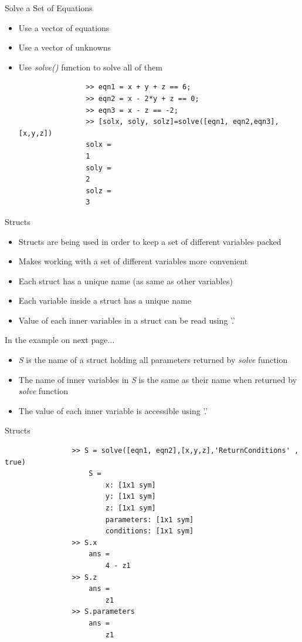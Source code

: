 \documentclass{beamer}
\begin{document}
\begin{frame}[fragile]{Solve a Set of Equations}
	\begin{block}{}
		\begin{itemize}
			\item Use a vector of equations
			\item Use a vector of unknowns
			\item Use \textit{solve()} function to solve all of them
			\java
			\begin{lstlisting}
				>> eqn1 = x + y + z == 6;
				>> eqn2 = x - 2*y + z == 0;
				>> eqn3 = x - z == -2;
				>> [solx, soly, solz]=solve([eqn1, eqn2,eqn3],[x,y,z])
				solx =
				1
				soly =
				2
				solz =
				3
			\end{lstlisting}
		\end{itemize}
	\end{block}
\end{frame}

\begin{frame}[fragile]{Structs}
	\begin{block}{}
		\begin{itemize}
			\item Structs are being used in order to keep a set of different variables packed
			\item Makes working with a set of different variables more convenient
			\item Each struct has a unique name (as same as other variables)
			\item Each variable inside a struct has a unique name
			\item Value of each inner variables in a struct can be read using '.'
		\end{itemize}
	\end{block}
	\begin{block}{In the example on next page...}
		\begin{itemize}
			\item \textit{S} is the name of a struct holding all parameters returned by \textit{solve} function
			\item The name of inner variables in \textit{S} is the same as their name when returned by \textit{solve} function
			\item The value of each inner variable is accessible using '.'
		\end{itemize}
	\end{block}
\end{frame}

\begin{frame}[fragile]{Structs}
	\begin{block}{}
			\java
				\begin{lstlisting}
				>> S = solve([eqn1, eqn2],[x,y,z],'ReturnConditions' , true)
					S = 
						x: [1x1 sym]
						y: [1x1 sym]
						z: [1x1 sym]
						parameters: [1x1 sym]
						conditions: [1x1 sym]
				>> S.x
					ans =
						4 - z1
				>> S.z
					ans =
						z1
				>> S.parameters
					ans =
						z1
 				\end{lstlisting}
	\end{block}
\end{frame}
\end{document}
